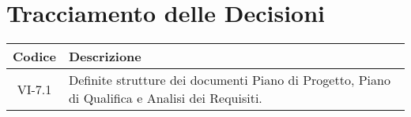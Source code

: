\section*{Tracciamento delle Decisioni}

\begin{center}
	\begin{longtable}{|c|p{14.5cm}|}
	\hline
	\rowcolor{lighter-grayer}
	\textbf{Codice} & \textbf{Descrizione} \\
	\hline
	\endfirsthead
	
	\hline
	VI-7.1 & Definite strutture dei documenti Piano di Progetto, Piano di Qualifica e Analisi dei Requisiti. \\
	\hline

	\end{longtable}
\end{center}